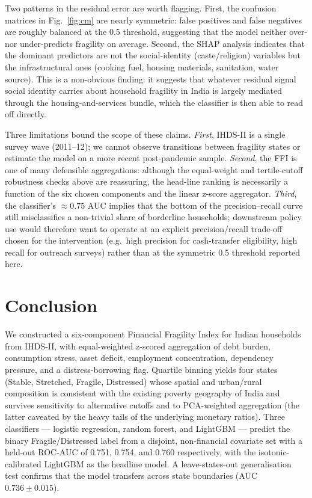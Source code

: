 \documentclass[colorlinks,balance]{asmeconf}
\begin{document}
Two patterns in the residual error are worth flagging. First, the confusion matrices in Fig.~\ref{fig:cm} are nearly symmetric: false positives and false negatives are roughly balanced at the 0.5 threshold, suggesting that the model neither over- nor under-predicts fragility on average. Second, the SHAP analysis indicates that the dominant predictors are not the social-identity (caste/religion) variables but the infrastructural ones (cooking fuel, housing materials, sanitation, water source). This is a non-obvious finding: it suggests that whatever residual signal social identity carries about household fragility in India is largely mediated through the housing-and-services bundle, which the classifier is then able to read off directly.

Three limitations bound the scope of these claims. \textit{First}, IHDS-II is a single survey wave (2011--12); we cannot observe transitions between fragility states or estimate the model on a more recent post-pandemic sample. \textit{Second}, the FFI is one of many defensible aggregations: although the equal-weight and tertile-cutoff robustness checks above are reassuring, the head-line ranking is necessarily a function of the six chosen components and the linear z-score aggregator. \textit{Third}, the classifier's $\approx 0.75$ AUC implies that the bottom of the precision--recall curve still misclassifies a non-trivial share of borderline households; downstream policy use would therefore want to operate at an explicit precision/recall trade-off chosen for the intervention (e.g.\ high precision for cash-transfer eligibility, high recall for outreach surveys) rather than at the symmetric 0.5 threshold reported here.

\section{Conclusion}
We constructed a six-component Financial Fragility Index for Indian households from IHDS-II, with equal-weighted z-scored aggregation of debt burden, consumption stress, asset deficit, employment concentration, dependency pressure, and a distress-borrowing flag. Quartile binning yields four states (Stable, Stretched, Fragile, Distressed) whose spatial and urban/rural composition is consistent with the existing poverty geography of India and survives sensitivity to alternative cutoffs and to PCA-weighted aggregation (the latter caveated by the heavy tails of the underlying monetary ratios). Three classifiers --- logistic regression, random forest, and LightGBM --- predict the binary Fragile/Distressed label from a disjoint, non-financial covariate set with a held-out ROC-AUC of 0.751, 0.754, and 0.760 respectively, with the isotonic-calibrated LightGBM as the headline model. A leave-states-out generalisation test confirms that the model transfers across state boundaries (AUC $0.736 \pm 0.015$).
\end{document}
